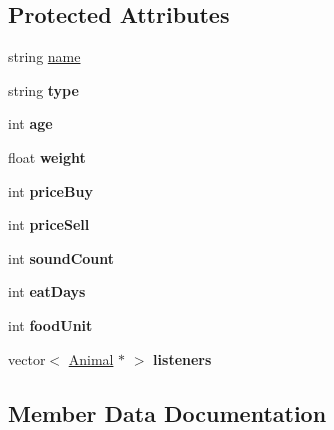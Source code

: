 \subsection*{Protected Attributes}
\begin{DoxyCompactItemize}
\item 
string \hyperlink{class_animal_a9cf3bfd9070daec7b3bbc87cbd958f35}{name}
\item 
\mbox{\label{class_animal_a8b120b31083a0561ab9969d5aeb03195}} 
string {\bfseries type}
\item 
\mbox{\label{class_animal_a31e4a23bef9596927496de4eb6b9c721}} 
int {\bfseries age}
\item 
\mbox{\label{class_animal_a055c4df7dacb89eb4c2ca9bbee11ff24}} 
float {\bfseries weight}
\item 
\mbox{\label{class_animal_ae18bdb6ca2de33354df5d877f159fb5b}} 
int {\bfseries price\+Buy}
\item 
\mbox{\label{class_animal_a5386cd93699ab24f8faddc3a2bfeea99}} 
int {\bfseries price\+Sell}
\item 
\mbox{\label{class_animal_a386cf61e5b26f85531a56cdefbae3784}} 
int {\bfseries sound\+Count}
\item 
\mbox{\label{class_animal_aab993ffc4b1e0a19c8c8f99deee70002}} 
int {\bfseries eat\+Days}
\item 
\mbox{\label{class_animal_a6782d3e905883a5aff6ce78f3550b415}} 
int {\bfseries food\+Unit}
\item 
\mbox{\label{class_animal_a15e2ae06f4ce89a2c1a20fa3f919586c}} 
vector$<$ \hyperlink{class_animal}{Animal} $\ast$ $>$ {\bfseries listeners}
\end{DoxyCompactItemize}


\subsection{Member Data Documentation}
\mbox{\label{class_animal_a9cf3bfd9070daec7b3bbc87cbd958f35}} 
